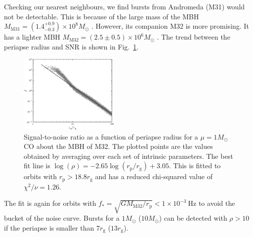 \documentclass[useAMS,usedcolumn,usegraphicx,usenatbib]{mn2e}
\newcommand{\figref}[1]{Fig.~\ref{fig:#1}}
\newcommand{\units}[1]{\ensuremath{~\mathrm{#1}}}
\newcommand{\sub}[1]{\ensuremath{_\mathrm{#1}}}
\begin{document}
Checking our nearest neighbours, we find bursts from Andromeda (M31) would not be detectable. This is because of the large mass of the MBH $M\sub{M31} = (1.4^{+0.9}_{-0.3}) \times 10^8 M_\odot$ \citep{Bender2005}. However, its companion M32 is more promising. It has a lighter MBH $M\sub{M32} = (2.5 \pm 0.5) \times 10^6 M_\odot$ \citep{Verolme2002}. The trend between the periapse radius and SNR is shown in \figref{SNR-M32}.
\begin{figure}
  \begin{center}
  \includegraphics[width=0.43\textwidth]{Fig_SNR_M32}
    \caption{Signal-to-noise ratio as a function of periapse radius for a $\mu = 1 M_\odot$ CO about the MBH of M32. The plotted points are the values obtained by averaging over each set of intrinsic parameters. The best fit line is $\log\left(\rho\right) = -2.65\log(r\sub{p}/r\sub{g}) + 3.05$. This is fitted to orbits with $r\sub{p} > 18.8 r\sub{g}$ and has a reduced chi-squared value of $\chi^2/\nu = 1.26$.\label{fig:SNR-M32}}
  \end{center}
\end{figure}
The fit is again for orbits with $f_\ast = \sqrt{GM\sub{M32}/r\sub{p}} < 1 \times 10^{-3}\units{Hz}$ to avoid the bucket of the noise curve. Bursts for a $1 M_\odot$ ($10 M_\odot$) can be detected with $\rho > 10$ if the periapse is smaller than $7 r\sub{g}$ ($13 r\sub{g}$).
\end{document}
